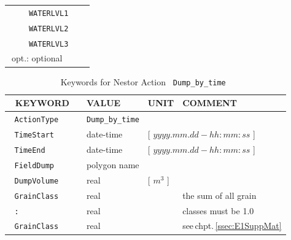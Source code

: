 \begin{table}[ht]
\begin{tabular}{| l | l | l | l | p{4.7cm} |}
{\textcolor{white}{\LARGE |}}                         &     &\texttt{WATERLVL1}     &                       &                     \\
{\textcolor{white}{\LARGE |}}                         &     &\texttt{WATERLVL2}     &                       &                     \\
{\textcolor{white}{\LARGE |}}                         &     &\texttt{WATERLVL3}     &                       &                     \\ \hline
\multicolumn{5}{|l|}{{\textcolor{white}{\LARGE |}}\small{opt.: optional}}                                                        \\ \hline
\end{tabular}
\end{table}


\begin{table}[ht]
\centering
\caption{Keywords for Nestor Action \texttt{~Dump\_by\_time~}}
\begin{tabular}{| l | l | l | l | p{4.5cm} |}
\hline
{\textcolor{white}{\LARGE |}} \textbf{KEYWORD}        &     &\textbf{VALUE}         &\textbf{UNIT}          &\textbf{COMMENT}     \\ \hline
{\textcolor{white}{\LARGE |}} \texttt{ActionType}     &     &\texttt{Dump\_by\_time}&                       &                     \\ \hline
{\textcolor{white}{\LARGE |}} \texttt{TimeStart}      &     &date-time              &\multicolumn{2}{l|}{[ $yyyy.mm.dd-hh:mm:ss$ ]} \\ \hline
{\textcolor{white}{\LARGE |}} \texttt{TimeEnd}        &     &date-time              &\multicolumn{2}{l|}{[ $yyyy.mm.dd-hh:mm:ss$ ]} \\ \hline
{\textcolor{white}{\LARGE |}} \texttt{FieldDump}      &     &polygon name           &                       &                     \\ \hline
{\textcolor{white}{\LARGE |}} \texttt{DumpVolume}     &     &real                   &[ $m^3$ ]              &                     \\ \hline
{\textcolor{white}{\LARGE |}} \texttt{GrainClass}     &     &real                   &                       &the sum of all grain \\
{\textcolor{white}{\LARGE |}} \texttt{:}              &     &real                   &                       &classes must be 1.0  \\
{\textcolor{white}{\LARGE |}} \texttt{GrainClass}     &     &real                   &                       &see\,chpt.\,\ref{ssec:E1SuppMat}\\ \hline

\end{tabular}
\end{table}
